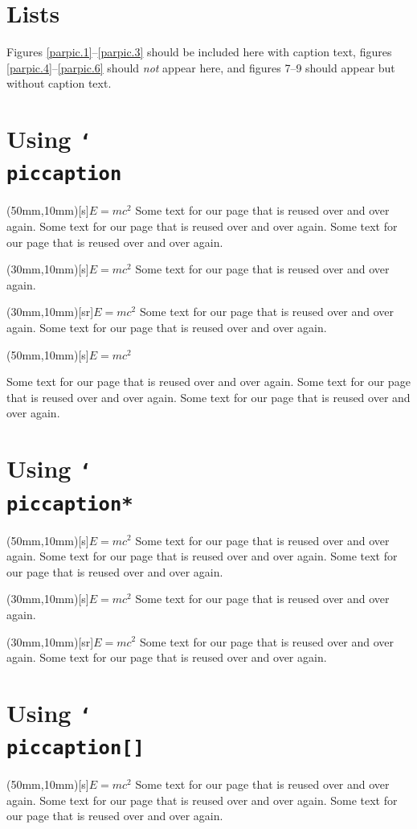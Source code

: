 \documentclass{tlc2/ttctexa}
\makeatletter
\newcommand\sample{Some text for our page
 that is reused over and over again. }
\newcommand\FOR{\(\displaystyle E=mc^2\)}
\DeclareRobustCommand\cs[1]{\texttt{\char`\\#1}}
\providecommand*\piccaptiontype[1]{\def\@captype{#1}}
\newcommand\texorpdfstring[2]{#1}
\newcommand*\captionsetup[2][]{}
\newcommand*\clearcaptionsetup[1]{}
\makeatother
\begin{document}
\section{Lists}

\listoffigures

\bigskip
Figures \ref{parpic.1}--\ref{parpic.3} should be included here with caption text,
figures \ref{parpic.4}--\ref{parpic.6} should \emph{not} appear here,
and figures 7--9 should appear but without caption text.

\listoftables

\clearpage
\section{Using \texorpdfstring{\cs{piccaption}}{piccaption}}

\piccaptioninside
{}
\parpic(50mm,10mm)[s]{\FOR}
\sample\sample\sample

\piccaptionside
{}
\parpic(30mm,10mm)[s]{\FOR}
\sample

\piccaptiontopside
{}
\parpic(30mm,10mm)[sr]{\FOR}
\sample\sample

\captionsetup[parpic]{textfont=it}
\piccaptiontype{table}
\piccaptioninside
{}
\parpic(50mm,10mm)[s]{\FOR}
\piccaptiontype{figure}
\clearcaptionsetup{parpic}
\sample\sample\sample

\clearpage
\section{Using \texorpdfstring{\cs{piccaption*}}{piccaption*}}

\piccaptioninside
{}
\parpic(50mm,10mm)[s]{\FOR}
\sample\sample\sample

\piccaptionside
{}
\parpic(30mm,10mm)[s]{\FOR}
\sample

\piccaptiontopside
{}
\parpic(30mm,10mm)[sr]{\FOR}
\sample\sample

\clearpage
\section{Using \texorpdfstring{\cs{piccaption[]}}{piccaption-eoa}}

\piccaptioninside
{}
\parpic(50mm,10mm)[s]{\FOR}
\sample\sample\sample
\end{document}
